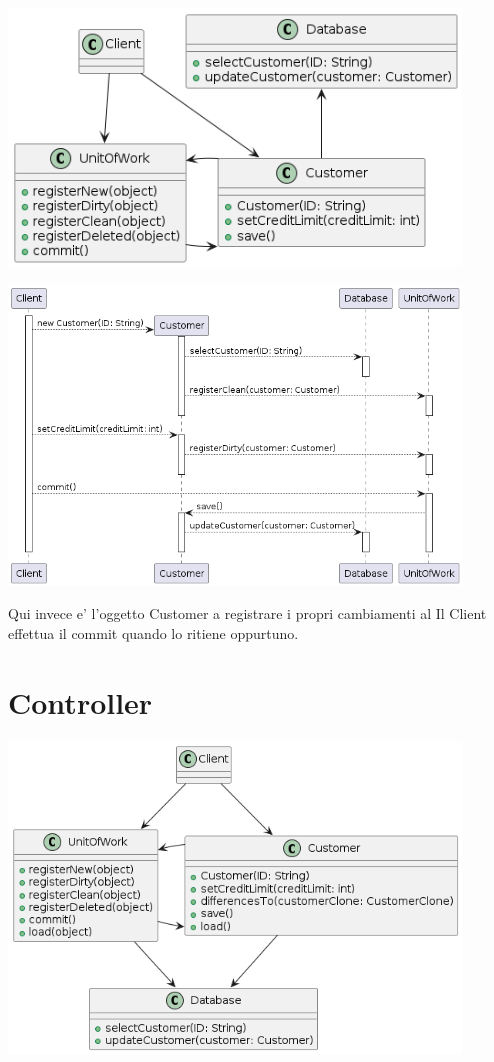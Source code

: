 \begin{center}
    \includegraphics[width=12cm]{images/unit-of-work/ObjectRegistrationClass.png}
\end{center}

\begin{center}
    \includegraphics[width=12cm]{images/unit-of-work/ObjectRegistrationSD.png}
\end{center}

Qui invece e' l'oggetto Customer a registrare i propri cambiamenti al
Il Client effettua il commit quando lo ritiene oppurtuno.

\section{Controller}

\begin{center}
    \includegraphics[width=12cm]{images/unit-of-work/ControllerClass.png}
\end{center}

